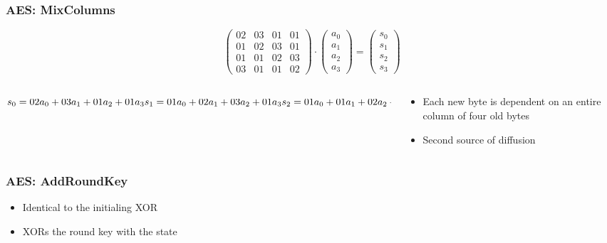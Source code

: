 \documentclass[12pt]{beamer}
\begin{document}
\begin{frame}
\frametitle{AES: MixColumns}

\[ \left( \begin{array}{cccc}
02 & 03 & 01 & 01 \\
01 & 02 & 03 & 01 \\
01 & 01 & 02 & 03 \\
03 & 01 & 01 & 02\end{array} \right)
\cdot
\left( \begin{array}{c}
a_0 \\
a_1 \\
a_2 \\
a_3\end{array} \right)
=
\left( \begin{array}{c}
s_0 \\
s_1 \\
s_2 \\
s_3\end{array} \right)
\]

\begin{columns}
\begin{column}{0.5\textwidth}
\pause
\begin{center}
$
s_0 = {02}a_0+{03}a_1+{01}a_2+{01}a_3 \\[0pt]
s_1 = {01}a_0+{02}a_1+{03}a_2+{01}a_3 \\[0pt]
s_2 = {01}a_0+{01}a_1+{02}a_2+{03}a_3 \\[0pt]
s_3 = {03}a_0+{01}a_1+{01}a_2+{02}a_3 \\[0pt]
$
\end{center}
\end{column}
\begin{column}{0.5\textwidth}
\begin{itemize}
\pause
\item Each new byte is dependent on an entire column of four old bytes \pause
\item Second source of diffusion
\end{itemize}
\end{column}
\end{columns}
\end{frame}


\begin{frame}
\frametitle{AES: AddRoundKey}
\begin{itemize}
\item Identical to the initialing XOR
\item XORs the round key with the state
\end{itemize}
\end{frame}
\end{document}
